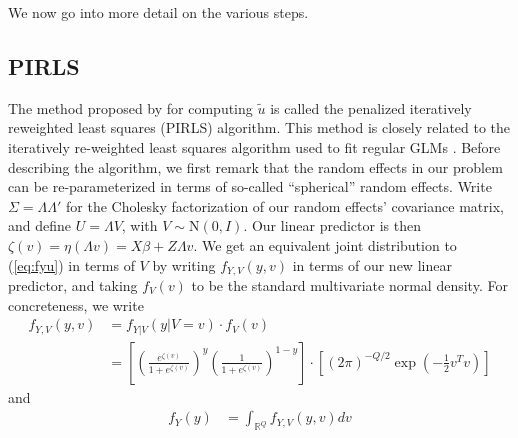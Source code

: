 \documentclass{article}
\newcommand{\bR}{\mathbb{R}}
\begin{document}
We now go into more detail on the various steps.

\subsection{PIRLS}
\label{sec:PIRLS}

The method proposed by \citet{Wal24} for computing $\tilde{u}$ is called the penalized iteratively reweighted least squares (PIRLS) algorithm. This method is closely related to the iteratively re-weighted least squares algorithm used to fit regular GLMs \citep[see Section 2.5 of ][]{McC89}. Before describing the algorithm, we first remark that the random effects in our problem can be re-parameterized in terms of so-called ``spherical'' random effects. Write $\Sigma = \Lambda \Lambda'$ for the Cholesky factorization of our random effects' covariance matrix, and define $U = \Lambda V$, with $V \sim \mathrm{N}(0, I)$. Our linear predictor is then $\zeta(v) = \eta(\Lambda v) = X \beta + Z \Lambda v$. We get an equivalent joint distribution to (\ref{eq:fyu}) in terms of $V$ by writing $f_{Y,V}(y,v)$ in terms of our new linear predictor, and taking $f_V(v)$ to be the standard multivariate normal density. For concreteness, we write
%
\begin{align}
    f_{Y,V}(y, v) &= f_{Y|V}(y | V=v) \cdot f_V(v)\\
    &= \left[ \left( \frac{e^{\zeta(v)}}{1 + e^{\zeta(v)}} \right)^y \left( \frac{1}{1 + e^{\zeta(v)}} \right)^{1-y} \right] \cdot \left[ (2 \pi)^{-Q/2} \exp \left( - \frac{1}{2} v^T v \right)\right] \label{eq:fyv}
\end{align}
%
and
%
\begin{align}
    f_Y(y) &= \int_{\bR^Q} f_{Y,V}(y,v) dv
\end{align}
\end{document}
